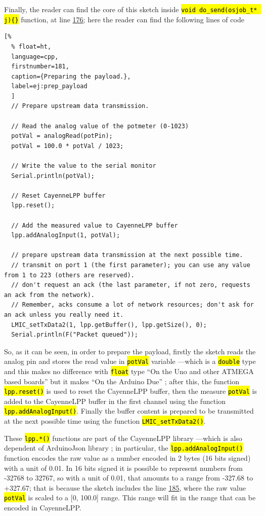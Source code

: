 \documentclass[11pt,a4paper,dvipsnames,twoside]{article}
\newcommand{\cmd}[1] {\hl{\texttt{#1}}}
\begin{document}
Finally, the reader can find the core of this sketch inside \cmd{void do\_send(osjob\_t* j)\{\}} function, at line \href{https://github.com/WyRe/lora-arduino-dendrometer/blob/master/src/arduino/dendro/dendro.ino#L176}{176}; here the reader can find the following lines of code

\begin{lstlisting}[%
  % float=ht,
  language=cpp,
  firstnumber=181,
  caption={Preparing the payload.},
  label=ej:prep_payload
  ]
  // Prepare upstream data transmission.
        
  // Read the analog value of the potmeter (0-1023)
  potVal = analogRead(potPin);
  potVal = 100.0 * potVal / 1023;
  
  // Write the value to the serial monitor
  Serial.println(potVal);
         
  // Reset CayenneLPP buffer
  lpp.reset();

  // Add the measured value to CayenneLPP buffer
  lpp.addAnalogInput(1, potVal);

  // prepare upstream data transmission at the next possible time.
  // transmit on port 1 (the first parameter); you can use any value from 1 to 223 (others are reserved).
  // don't request an ack (the last parameter, if not zero, requests an ack from the network).
  // Remember, acks consume a lot of network resources; don't ask for an ack unless you really need it.
  LMIC_setTxData2(1, lpp.getBuffer(), lpp.getSize(), 0);
  Serial.println(F("Packet queued"));
\end{lstlisting}

So, as it can be seen, in order to prepare the payload, firstly the sketch reads the analog pin and stores the read value in \cmd{potVal} variable ---which is a \cmd{double} type and this makes no difference with \cmd{float} type \enquote{On the Uno and other ATMEGA based boards} but it makes \enquote{On the Arduino Due} \cite{Ard_double_type}; after this, the function \cmd{lpp.reset()} is used to reset the CayenneLPP buffer, then the measure \cmd{potVal} is added to the CayenneLPP buffer in the first channel using the function \cmd{lpp.addAnalogInput()}. Finally the buffer content is prepared to be transmitted at the next possible time using the function \cmd{LMIC\_setTxData2()}. 

These \cmd{lpp.*()} functions are part of the CayenneLPP library \cite{CayenneLPP_lib} ---which is also dependent of ArduinoJson library \cite{ArduinoJson_lib}; in particular, the \cmd{lpp.addAnalogInput()} function encodes the raw value as a number encoded in 2 bytes (16 bits signed) with a unit of 0.01. In 16 bits signed it is possible to represent numbers from -32768 to 32767, so with a unit of 0.01, that amounts to a range from -327.68 to +327.67; that is because the sketch includes the line \href{https://github.com/WyRe/lora-arduino-dendrometer/blob/master/src/arduino/dendro/dendro.ino#L185}{185}, where the raw value \cmd{potVal} is scaled to a [0, 100.0] range. This range will fit in the range that can be encoded in CayenneLPP. 
\end{document}

